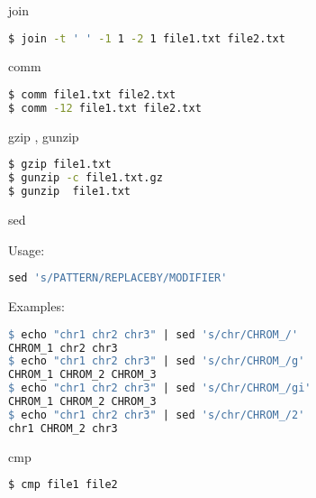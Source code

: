 \documentclass{beamer}
\begin{document}
\begin{frame}[fragile]
 \begin{center}
    \huge{join}\\
    \end{center}
\begin{lstlisting}[language=bash]
$ join -t '	' -1 1 -2 1 file1.txt file2.txt
\end{lstlisting}
\end{frame}

\begin{frame}[fragile]
 \begin{center}
    \huge{comm}\\
    \end{center}
\begin{lstlisting}[language=bash]
$ comm file1.txt file2.txt
$ comm -12 file1.txt file2.txt
\end{lstlisting}
\end{frame}


\begin{frame}[fragile]
 \begin{center}
    \huge{gzip , gunzip}\\
    \end{center}
\begin{lstlisting}[language=bash]
$ gzip file1.txt
$ gunzip -c file1.txt.gz
$ gunzip  file1.txt
\end{lstlisting}
\end{frame}

\begin{frame}[fragile]
\begin{center}
    \huge{sed}\\
\end{center}
Usage:
\begin{lstlisting}[language=make]
sed 's/PATTERN/REPLACEBY/MODIFIER'
\end{lstlisting}
Examples:
\begin{lstlisting}[language=make]
$ echo "chr1 chr2 chr3" | sed 's/chr/CHROM_/'
CHROM_1 chr2 chr3
$ echo "chr1 chr2 chr3" | sed 's/chr/CHROM_/g'
CHROM_1 CHROM_2 CHROM_3
$ echo "chr1 chr2 chr3" | sed 's/Chr/CHROM_/gi'
CHROM_1 CHROM_2 CHROM_3
$ echo "chr1 chr2 chr3" | sed 's/chr/CHROM_/2'
chr1 CHROM_2 chr3
\end{lstlisting}
\end{frame}


\begin{frame}[fragile]
 \begin{center}
    \huge{cmp}\\
    \end{center}
\begin{lstlisting}[language=bash]
$ cmp file1 file2
\end{lstlisting}
\end{frame}
\end{document}
